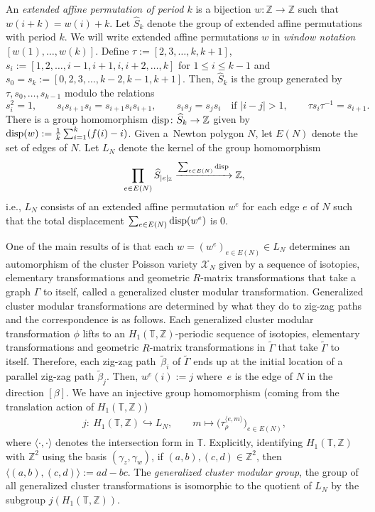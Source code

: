 \documentclass[pdftex]{sigma}
\numberwithin{equation}{section}
\newcommand{\Z}{{\mathbb Z}}
\newcommand{\T}{{\mathbb T}}
\newcommand{\disp}{{\rm disp}}
\newcommand{\ra}{\rightarrow}
\begin{document}
	An \textit{extended affine permutation of period $k$} is a bijection $w\colon \Z \ra \Z$ such that ${w(i+k)}={w(i)+k}$. Let $\hat S_k$ denote the group of extended affine permutations with period $k$. We will write extended affine permutations $w$ in \emph{window notation} $[w(1), \dots, w(k)]$. Define $\tau\!:=\![2,3,\dots ,k,\allowbreak {k+1}]$, $s_i:= [1,2,\dots ,i-1,i+1,i,i+2,\dots ,k]$ for $1\leq i\leq k-1$ and $s_0=s_k:= [0,2,3,\dots ,{k-2},\allowbreak{k-1},{k+1}]$. Then, $\widehat S_k$ is the group generated by $\tau,s_0,\dots,s_{k-1}$ modulo the relations
	\[
	s_i^2=1, \qquad s_i s_{i+1} s_i = s_{i+1} s_i s_{i+1}, \qquad s_i s_j=s_j s_i \quad \text{if $|i-j|>1$} ,\qquad \tau s_{i}\tau ^{-1}=s_{i+1}.
	\]
	There is a group homomorphism $\disp\colon \widehat S_k \ra \Z$ given by $\disp(w):=\frac 1 k \sum_{i=1}^k (f(i)-i)$. Given a~Newton polygon $N$, let $E(N)$ denote the set of edges of $N$. Let $L_N$ denote the kernel of the group homomorphism
	\[
	\prod_{e \in E(N)} \widehat S_{|e|_\Z} \xrightarrow[]{\sum_{e \in E(N)} \disp} \Z,
	\]
	i.e., $L_N$ consists of an extended affine permutation $w^e$ for each edge $e$ of $N$ such that the total displacement $\sum_{e \in E(N)} \disp(w^e)$ is $0$.
	
One of the main results of \cite{GeRa} is that each $w=(w^e)_{e \in E(N)} \in L_N$ determines an automorphism of the cluster Poisson variety $\mathcal X_N$ given by a sequence of isotopies, elementary transformations and geometric $R$-matrix transformations that take a graph $\Gamma$ to itself, called a {generalized cluster modular transformation}. Generalized cluster modular transformations are determined by what they do to zig-zag paths and the correspondence is as follows. Each generalized cluster modular transformation $\phi$ lifts to an $H_1(\T,\Z)$-periodic sequence of isotopies, elementary transformations and geometric $R$-matrix transformations in $\widetilde \Gamma$ that take $\widetilde \Gamma$ to itself. Therefore, each zig-zag path~$\widetilde \beta_i$ of $\widetilde \Gamma$ ends up at the initial location of a parallel zig-zag path $\widetilde \beta_j$. Then, $w^e(i):=j$ where~$e$ is the edge of $N$ in the direction $[\beta]$. We have an injective group homomorphism (coming from the translation action of $H_1(\T,\Z)$)
	\begin{align*}
		j\colon\ H_1(\T,\Z) \hookrightarrow L_N,\qquad
		m \mapsto \big(\tau_\rho^{\langle e,m \rangle} \big)_{e \in E(N)},
	\end{align*}
	where $\langle \cdot,\cdot \rangle$ denotes the intersection form in $\T$. Explicitly, identifying $H_1(\T,\Z)$ with $\Z^2$ using the basis $(\gamma_z,\gamma_w)$, if $(a,b), (c,d) \in \Z^2$, then $\langle (a,b),(c,d) \rangle := ad-bc$. The \textit{generalized cluster modular group}, the group of all generalized cluster transformations is isomorphic to the quotient of $L_N$ by the subgroup $j(H_1(\T,\Z))$.
	
\end{document}
